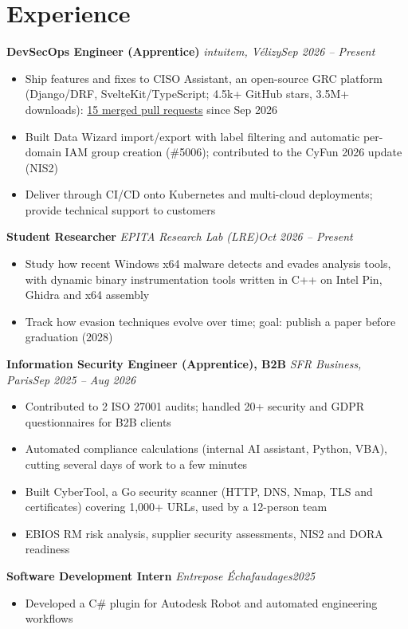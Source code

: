 \documentclass[10pt]{article}
\newcommand{\role}[4]{\textbf{#1} \textbar{} \textit{#2}\hfill\textit{#3}\par\vspace{0pt}}
\newcommand{\gap}{\vspace{4pt}}
\begin{document}
\section{Experience}
\role{DevSecOps Engineer (Apprentice)}{intuitem, Vélizy}{Sep 2026 -- Present}{}
\begin{itemize}
\item Ship features and fixes to CISO Assistant, an open-source GRC platform (Django/DRF, SvelteKit/TypeScript; 4.5k+ GitHub stars, 3.5M+ downloads): \href{https://github.com/intuitem/ciso-assistant-community/pulls?q=is:pr+is:merged+author:Spaghetto784}{15 merged pull requests} since Sep 2026
\item Built Data Wizard import/export with label filtering and automatic per-domain IAM group creation (\#5006); contributed to the CyFun 2026 update (NIS2)
\item Deliver through CI/CD onto Kubernetes and multi-cloud deployments; provide technical support to customers
\end{itemize}\gap
\role{Student Researcher}{EPITA Research Lab (LRE)}{Oct 2026 -- Present}{}
\begin{itemize}
\item Study how recent Windows x64 malware detects and evades analysis tools, with dynamic binary instrumentation tools written in C++ on Intel Pin, Ghidra and x64 assembly
\item Track how evasion techniques evolve over time; goal: publish a paper before graduation (2028)
\end{itemize}\gap
\role{Information Security Engineer (Apprentice), B2B}{SFR Business, Paris}{Sep 2025 -- Aug 2026}{}
\begin{itemize}
\item Contributed to 2 ISO 27001 audits; handled 20+ security and GDPR questionnaires for B2B clients
\item Automated compliance calculations (internal AI assistant, Python, VBA), cutting several days of work to a few minutes
\item Built CyberTool, a Go security scanner (HTTP, DNS, Nmap, TLS and certificates) covering 1,000+ URLs, used by a 12-person team
\item EBIOS RM risk analysis, supplier security assessments, NIS2 and DORA readiness
\end{itemize}\gap
\role{Software Development Intern}{Entrepose \'Echafaudages}{2025}{}
\begin{itemize}\item Developed a C\# plugin for Autodesk Robot and automated engineering workflows\end{itemize}
\end{document}
